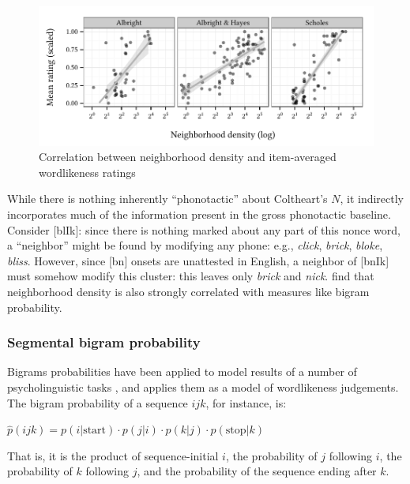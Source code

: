 \begin{figure}
\centering
\includegraphics{neighborhood.pdf}
\caption{Correlation between neighborhood density and item-averaged wordlikeness ratings}
\label{neighborhood}
\end{figure}

While there is nothing inherently ``phonotactic'' about Coltheart's $N$, it indirectly incorporates much of the information present in the gross phonotactic baseline. Consider [blIk]: since there is nothing marked about any part of this nonce word, a ``neighbor'' might be found by modifying any phone: e.g., \emph{click}, \emph{brick}, \emph{bloke}, \emph{bliss}. However, since [bn] onsets are unattested in English, a neighbor of [bnIk] must somehow modify this cluster: this leaves only \emph{brick} and \emph{nick}. \citet{Frauenfelder1993} find that neighborhood density is also strongly correlated with measures like bigram probability.

\subsubsection{Segmental bigram probability}

Bigrams probabilities have been applied to model results of a number of psycholinguistic tasks \citep[e.g.,][]{Pitt1998,Vitevitch2005}, and \citet{Albright2009a} applies them as a model of wordlikeness judgements. The bigram probability of a sequence $ijk$, for instance, is:

\begin{unlabeledexample}
$\displaystyle \hat{p}(ijk) = p(i|\textrm{start}) \cdot p(j|i) \cdot p(k|j) \cdot p(\textrm{stop}|k)$
\end{unlabeledexample}

\noindent
That is, it is the product of sequence-initial $i$, the probability of $j$ following $i$, the probability of $k$ following $j$, and the probability of the sequence ending after $k$.

